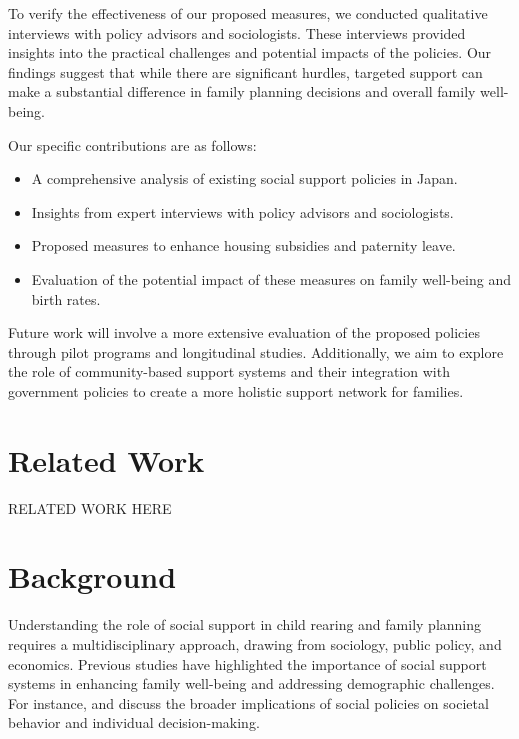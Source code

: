 \documentclass{article} %
\begin{document}
To verify the effectiveness of our proposed measures, we conducted qualitative interviews with policy advisors and sociologists. These interviews provided insights into the practical challenges and potential impacts of the policies. Our findings suggest that while there are significant hurdles, targeted support can make a substantial difference in family planning decisions and overall family well-being.

Our specific contributions are as follows:
\begin{itemize}
    \item A comprehensive analysis of existing social support policies in Japan.
    \item Insights from expert interviews with policy advisors and sociologists.
    \item Proposed measures to enhance housing subsidies and paternity leave.
    \item Evaluation of the potential impact of these measures on family well-being and birth rates.
\end{itemize}

Future work will involve a more extensive evaluation of the proposed policies through pilot programs and longitudinal studies. Additionally, we aim to explore the role of community-based support systems and their integration with government policies to create a more holistic support network for families.

\section{Related Work}
\label{sec:related}
RELATED WORK HERE

\section{Background}
\label{sec:background}

Understanding the role of social support in child rearing and family planning requires a multidisciplinary approach, drawing from sociology, public policy, and economics. Previous studies have highlighted the importance of social support systems in enhancing family well-being and addressing demographic challenges. For instance, \citet{park2023generative} and \citet{shanahan2023role} discuss the broader implications of social policies on societal behavior and individual decision-making.
\end{document}
